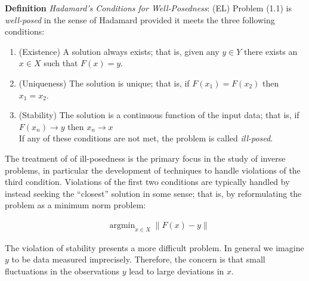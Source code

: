 \documentclass[12pt]{amsart}
\newcommand*{\norm}[1]{\left\lVert#1\right\rVert}
\DeclareMathOperator*{\argmin}{argmin}
\begin{document}
\textbf{Definition} \textit{Hadamard's Conditions for Well-Posedness}: (EL) Problem (1.1) is \textit{well-posed} in the sense of Hadamard provided it meets the three following conditions: 
\begin{enumerate} 
\item (Existence) A solution always exists; that is, given any $y \in Y$ there exists an $x \in X$ such that $F(x) = y$. 
\item (Uniqueness) The solution is unique; that is, if $F(x_1) = F(x_2)$ then $x_1 = x_2$.
\item (Stability) The solution is a continuous function of the input data; that is, if $F(x_n) \to y$  then $x_n \to x$ \\
If any of these conditions are not met, the problem is called \textit{ill-posed}. 
\end{enumerate} 

The treatment of of ill-posedness is the primary focus in the study of inverse problems, in particular the development of techniques to handle violations of the third condition. Violations of the first two conditions are typically handled by instead seeking the ``closest'' solution in some sense; that is, by reformulating the problem as a minimum norm problem: 

\begin{align*}
&\argmin_{x \in X} \norm{F(x) - y}
\end{align*}
 
 The violation of stability presents a more difficult problem. In general we imagine $y$ to be data measured imprecisely. Therefore, the concern is that small fluctuations in the observations $y$ lead to large deviations in $x$. 
\end{document}
